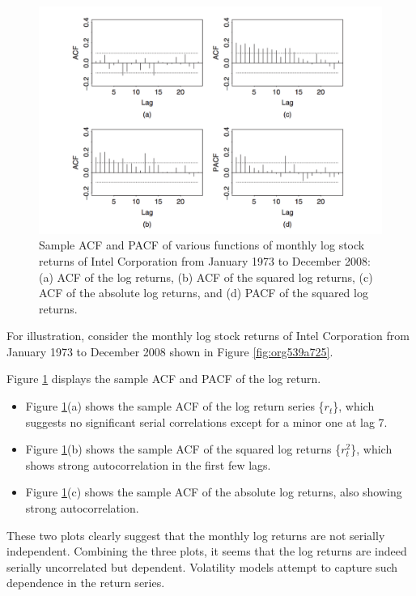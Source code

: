 \documentclass[a4paper,11pt]{article}
\begin{document}
\begin{figure}[htbp]
\centering
\includegraphics[width=\textwidth]{img/acf_intel.png}
\caption{\label{fig:org9e2640c}
Sample ACF and PACF of various functions of monthly log stock returns of Intel Corporation from January 1973 to December 2008: (a) ACF of the log returns, (b) ACF of the squared log returns, (c) ACF of the absolute log returns, and (d) PACF of the squared log returns.}
\end{figure}

For illustration, consider the monthly log stock returns of Intel
Corporation from January 1973 to December 2008 shown in Figure
\ref{fig:org539a725}.

Figure \ref{fig:org9e2640c} displays the sample ACF and PACF of the
log return.
\begin{itemize}
\item Figure \ref{fig:org9e2640c}(a) shows the sample ACF of the log
return series \{\(r_t\)\}, which suggests no significant serial correlations
except for a minor one at lag 7.
\item Figure \ref{fig:org9e2640c}(b) shows the sample ACF of the squared log returns
\{\(r^2_t\)\}, which shows strong autocorrelation in the first few
lags.
\item Figure  \ref{fig:org9e2640c}(c) shows the sample ACF of the
absolute log returns, also showing strong autocorrelation.
\end{itemize}

These two plots clearly suggest that the monthly log returns are not
serially independent. Combining the three plots, it seems that the
log returns are indeed serially uncorrelated but
dependent. Volatility models attempt to capture such dependence in
the return series.
\end{document}
